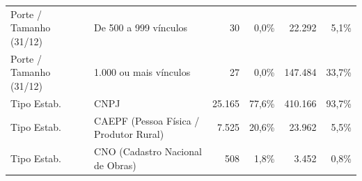 \documentclass[10pt,a4paper]{article}
\begin{document}
\begin{minipage}{\linewidth}
{{\begin{tabular}{llrrrr}
\rowcolor{corfundo} Porte / Tamanho (31/12) & De 500 a 999 vínculos & 30 & 0,0\% & 22.292 & 5,1\% \\
Porte / Tamanho (31/12) & 1.000 ou mais vínculos & 27 & 0,0\% & 147.484 & 33,7\% \\
\rowcolor{corfundo} Tipo Estab. & CNPJ & 25.165 & 77,6\% & 410.166 & 93,7\% \\
Tipo Estab. & CAEPF (Pessoa Física / Produtor Rural) & 7.525 & 20,6\% & 23.962 & 5,5\% \\
\rowcolor{corfundo} Tipo Estab. & CNO (Cadastro Nacional de Obras) & 508 & 1,8\% & 3.452 & 0,8\% \\
\bottomrule
\end{tabular}%
}%
}
  \par{}
\end{minipage}
\par\vspace{0.08cm}
\end{document}
